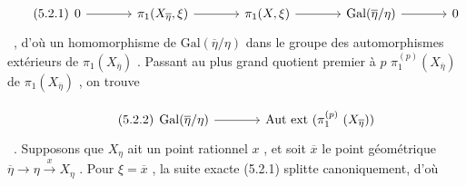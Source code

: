 \begin{equation}\tag{5.2.1}
\begin{tikzcd}[column sep=large, row sep=tiny]
0 \arrow[r] & \pi_1(X_{\overline{\eta}},\xi) \arrow[r] & \pi_1(X,\xi) \arrow[r] & \mathrm{Gal}(\overline{\eta}/\eta) \arrow[r] & 0
\end{tikzcd}
\end{equation}\ ,
d'où un homomorphisme de  $\mathrm{Gal}(\overline{\eta}/\eta)$  dans le groupe des automorphismes extérieurs de $\pi_1(X_{\overline{\eta}})$ . Passant au plus grand quotient premier à  $p$  $\pi_1^{(p)}(X_{\overline{\eta}})$  de  $\pi_1(X_{\overline{\eta}})$ , on trouve

\begin{equation}\tag{5.2.2}
\begin{tikzcd}[column sep=large, row sep=tiny]
\mathrm{Gal}(\overline{\eta}/\eta) \arrow[r] & \mathrm{Aut}\ \mathrm{ext}\ (\pi_1^{(p)}\ (X_{\overline{\eta}}))
\end{tikzcd}
\end{equation}\ .
Supposons que  $X_\eta$  ait un point rationnel  $x$ , et soit  $\overline{x}$  le point géométrique  $\overline{\eta} \longrightarrow \eta \xrightarrow{\ x\ } X_\eta$ . Pour  $\xi = \overline{x}$ , la suite exacte (5.2.1) splitte canoniquement, d'où


